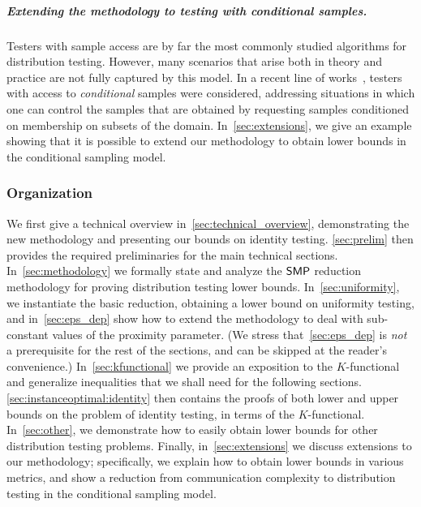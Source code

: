 \subparagraph{Extending the methodology to testing with conditional samples.} Testers with sample access are by far the most commonly studied algorithms for distribution testing. However, many scenarios that arise both in theory and practice are not  fully captured by this model. In a recent line of works~\cite{CFGM:13,CRS:15,ACK:14,FJOPS:15,FLV:16}, testers with access to \emph{conditional} samples were considered, addressing situations in which one can control the samples that are obtained by requesting samples conditioned on membership on subsets of the domain. In~\cref{sec:extensions}, we give an example showing that it is possible to extend our methodology to obtain lower bounds in the conditional sampling model.

\subsubsection{Organization}
We first give a technical overview in~\cref{sec:technical_overview}, demonstrating the new methodology and presenting our bounds on identity testing. \cref{sec:prelim} then provides the required preliminaries for the main technical sections. In~\cref{sec:methodology} we formally state and analyze the $\mathsf{SMP}$ reduction methodology for proving distribution testing lower bounds. In~\cref{sec:uniformity}, we instantiate the basic reduction, obtaining a lower bound on uniformity testing, and in~\cref{sec:eps_dep} show how to extend the methodology to deal with sub-constant values of the proximity parameter. (We stress that~\cref{sec:eps_dep} is \emph{not} a prerequisite for the rest of the sections, and can be skipped at the reader's convenience.) In~\cref{sec:kfunctional} we provide an exposition to the $K$-functional and generalize inequalities that we shall need for the following sections. \cref{sec:instanceoptimal:identity} then contains the proofs of both lower and upper bounds on the problem of identity testing, in terms of the $K$-functional. In~\cref{sec:other}, we demonstrate how to easily obtain lower bounds for other distribution testing problems. Finally, in~\cref{sec:extensions} we discuss extensions to our methodology; specifically, we explain how to obtain lower bounds in various metrics, and show a reduction from communication complexity to distribution testing in the conditional sampling model.

